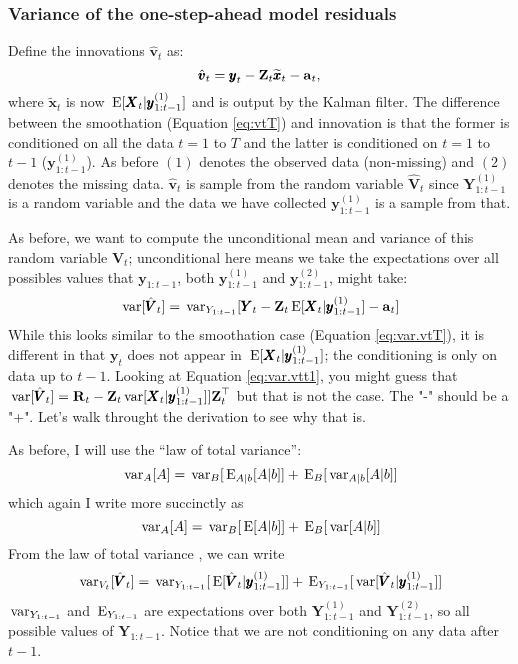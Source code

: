\documentclass[]{article}
\def\XI{\mbox{\boldmath $\Xi$}}
\def\E{\,\textup{\textrm{E}}}
\def\RR{\mbox{$\mathbf R$}}	 \def\rr{\mbox{$\mathbf r$}} \def\Rb{\mbox{$\mathbf H$}}	\def\Rm{\mathbb{R}}
\def\VV{\mbox{$\pmb{V}$}}	\def\vv{\mbox{$\pmb{v}$}}
\def\XX{\mbox{$\pmb{X}$}}	\def\xx{\mbox{$\pmb{x}$}}
\def\YY{\mbox{$\pmb{Y}$}}	\def\yy{\mbox{$\pmb{y}$}}
\def\ZZ{\mbox{$\mathbf Z$}}	\def\zz{\mbox{$\mathbf z$}}	\def\Zb{\mbox{$\mathbf M$}} \def\Za{\mbox{$\mathbf N$}} \def\Zm{\XI}
\def\var{\,\textup{\textrm{var}}}
\def\hatxt{\widetilde{\xx}_t}
\begin{document}
\subsubsection{Variance of the one-step-ahead model residuals}

Define the innovations $\hat{\vv}_t$ as:
\begin{equation}\label{eq:vtt1}
\hat{\vv}_t = \yy_t - \ZZ_t\hatxt - \aa_t,
\end{equation}
where  $\hatxt$ is now $\E[\XX_t|\yy^{(1)}_{1:t-1}]$ and is output by the Kalman filter. The difference between the smoothation (Equation \ref{eq:vtT}) and innovation is that the former is conditioned on all the data $t=1$ to $T$ and the latter is conditioned on $t=1$ to $t-1$ ($\yy^{(1)}_{1:t-1}$). As before $(1)$ denotes the observed data (non-missing) and $(2)$ denotes the missing data.  $\hat{\vv}_t$ is sample from the random variable $\hat{\VV}_t$ since $\YY^{(1)}_{1:t-1}$ is a random variable and the data we have collected $\yy^{(1)}_{1:t-1}$ is a sample from that. 

As before, we want to compute the unconditional mean and variance of this random variable $\hat{\VV}_t$; unconditional here means we take the expectations over all possibles values that $\yy_{1:t-1}$, both $\yy^{(1)}_{1:t-1}$ and $\yy^{(2)}_{1:t-1}$, might take:
\begin{equation}\label{eq:var.vtt1}
\var[\hat{\VV}_t] = \var_{Y_{1:t-1}}[\YY_t - \ZZ_t\E[\XX_t|\yy^{(1)}_{1:t-1}] - \aa_t]
\end{equation}
While this looks similar to the smoothation case (Equation \ref{eq:var.vtT}), it is different in that $\yy_t$ does not appear in $\E[\XX_t|\yy^{(1)}_{1:t-1}]$; the conditioning is only on data up to $t-1$. Looking at Equation \ref{eq:var.vtt1}, you might guess that $\var[\hat{\VV}_t] = \RR_t - \ZZ_t\var[ \XX_t | \yy^{(1)}_{1:t-1}] ]\ZZ_t^\top$ but that is not the case. The "-" should be a "+". Let's walk throught the derivation to see why that is.

As before, I will use the ``law of total variance'':
\begin{equation}
\var_A[A] = \var_B[\E_{A|b}[A|b]] + \E_B[\var_{A|b}[A|b]]
\end{equation}
which again I write more succinctly as
\begin{equation}
\var_A[A] = \var_B[\E[A|b]] + \E_B[\var[A|b]]
\end{equation}
From the law of total variance , we can write
\begin{equation}\label{var.vvt1.totalvar}
\var_{V_t}[\hat{\VV}_t] = \var_{Y_{1:t-1}}[\E[\hat{\VV}_t|\yy^{(1)}_{1:t-1}]] + \E_{Y_{1:t-1}}[\var[\hat{\VV}_t|\yy^{(1)}_{1:t-1}]]
\end{equation}
$\var_{Y_{1:t-1}}$ and $\E_{Y_{1:t-1}}$ are expectations over both $\YY^{(1)}_{1:t-1}$ and $\YY^{(2)}_{1:t-1}$, so all possible values of $\YY_{1:t-1}$. Notice that we are not conditioning on any data after $t-1$.
\end{document}
